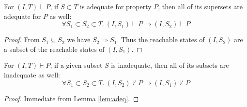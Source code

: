 

\begin{lemma}
\label{lem:adeq}
For $(I, T) \vdash P$, if $S \subset T$ is adequate for property $P$, then all of its supersets are adequate for $P$ as well:
\allowbreak $$\forall S_1 \subset S_2 \subset T.~ (I, S_1) \vdash P \Rightarrow (I, S_2) \vdash P$$
\end{lemma}
\begin{proof}
From $S_1 \subseteq S_2$ we have $S_2 \Rightarrow S_1$. Thus the
  reachable states of $(I, S_2)$ are a subset of the reachable states
  of $(I, S_1)$.
\end{proof}

\begin{corol}
\label{lem:inadeq}
For $(I, T) \vdash P$, if a given subset $S$ is inadequate, then all of its subsets are inadequate as well:
\allowbreak $$\forall S_1 \subset S_2 \subset T.~ (I, S_2) \nvdash P \Rightarrow (I, S_1) \nvdash P$$
\end{corol}
\begin{proof}
  Immediate from Lemma \ref{lem:adeq}.
\end{proof}


